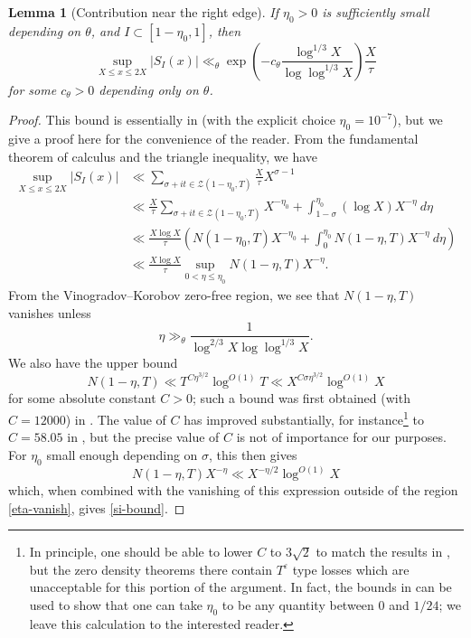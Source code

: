 \documentclass[12pt]{amsart}
\newtheorem{lemma}{Lemma}[section]
\newcommand{\eps}{\varepsilon}
\begin{document}
\begin{lemma}[Contribution near the right edge]\label{right-edge}  If $\eta_0>0$ is sufficiently small depending on $\theta$, and $I \subset [1-\eta_0,1]$, then
  \begin{equation}\label{si-bound}
\sup_{X \leq x \leq 2X}|S_I(x)| \ll_\theta \exp\left(-c_\theta \frac{\log^{1/3} X}{\log\log^{1/3} X} \right)\frac{X}{\tau}
  \end{equation}
  for some $c_\theta>0$ depending only on $\theta$.
\end{lemma}

\begin{proof} This bound is essentially in \cite[\S 3]{HB-2} (with the explicit choice $\eta_0 = 10^{-7}$), but we give a proof here for the convenience of the reader.
  From the fundamental theorem of calculus and the triangle inequality, we have
\begin{align*}
\sup_{X \leq x \leq 2X}|S_I(x)| &\ll \sum_{\sigma+it \in {\mathcal Z}(1-\eta_0,T)} \frac{X}{\tau} X^{\sigma-1} \\
&\ll \frac{X}{\tau} \sum_{\sigma+it \in {\mathcal Z}(1-\eta_0,T)} X^{-\eta_0} + \int_{1-\sigma}^{\eta_0} (\log X) X^{-\eta}\ d\eta \\
&\ll \frac{X \log X}{\tau} \left( N(1-\eta_0,T) X^{-\eta_0} + \int_{0}^{\eta_0} N(1-\eta,T) X^{-\eta}\ d\eta \right)\\
&\ll \frac{X \log X}{\tau} \sup_{0 < \eta \leq \eta_0} N(1-\eta,T) X^{-\eta}.
\end{align*}
From the Vinogradov--Korobov zero-free region, we see that $N(1-\eta,T)$ vanishes unless
\begin{equation}\label{eta-vanish}
  \eta \gg_\theta \frac{1}{\log^{2/3} X \log\log^{1/3} X}.
\end{equation}
We also have the upper bound
$$ N(1-\eta,T) \ll T^{C \eta^{3/2}} \log^{O(1)} T \ll X^{C \sigma \eta^{3/2}} \log^{O(1)} X$$
for some absolute constant $C>0$; such a bound was first obtained (with $C = 12000$) in \cite[Theorem 38.2]{turan}.  The value of $C$ has improved substantially, for instance\footnote{In principle, one should be able to lower $C$ to $3\sqrt{2}$ to match the results in \cite{pintz}, but the zero density theorems there contain $T^\eps$ type losses which are unacceptable for this portion of the argument. In fact, the bounds in \cite{pintz} can be used to show that one can take $\eta_0$ to be any quantity between $0$ and $1/24$; we leave this calculation to the interested reader.} to $C=58.05$ in \cite{ford}, but the precise value of $C$ is not of importance for our purposes.  For $\eta_0$ small enough depending on $\sigma$, this then gives
$$ N(1-\eta,T) X^{-\eta} \ll X^{-\eta/2} \log^{O(1)} X$$
which, when combined with the vanishing of this expression outside of the region \eqref{eta-vanish}, gives \eqref{si-bound}.
\end{proof}
\end{document}
